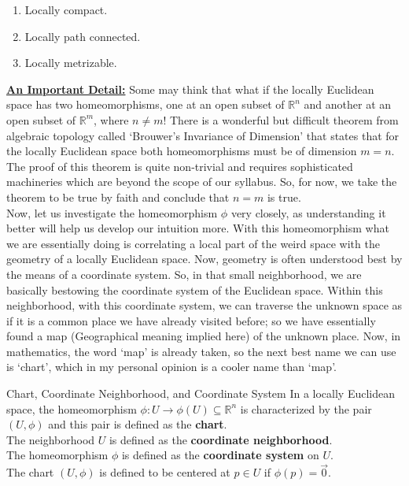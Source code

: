 \begin{enumerate}
	\item Locally compact.
	\item Locally path connected.
	\item Locally metrizable.
\end{enumerate}
\textbf{\underline{An Important Detail:}} Some may think that what if the locally Euclidean space has two homeomorphisms, one at an open subset of $\mathbb{R}^n$ and another at an open subset of $\mathbb{R}^m$, where $n\neq m$! There is a wonderful but difficult theorem from algebraic topology called `Brouwer's Invariance of Dimension' that states that for the locally Euclidean space both homeomorphisms must be of dimension $m=n$. The proof of this theorem is quite non-trivial and requires sophisticated machineries which are beyond the scope of our syllabus. So, for now, we take the theorem to be true by faith and conclude that $n=m$ is true.\\
Now, let us investigate the homeomorphism $\phi$ very closely, as understanding it better will help us develop our intuition more. With this homeomorphism what we are essentially doing is correlating a local part of the weird space with the geometry of a locally Euclidean space. Now, geometry is often understood best by the means of a coordinate system. So, in that small neighborhood, we are basically bestowing the coordinate system of the Euclidean space. Within this neighborhood, with this coordinate system, we can traverse the unknown space as if it is a common place we have already visited before; so we have essentially found a map (Geographical meaning implied here) of the unknown place. Now, in mathematics, the word `map' is already taken, so the next best name we can use is `chart', which in my personal opinion is a cooler name than `map'.
\begin{Definition}{Chart, Coordinate Neighborhood, and Coordinate System}\label{chart_coordinate_neighborhood_coordinate_system}
	In a locally Euclidean space, the homeomorphism $\phi: U\to \phi(U)\subseteq \mathbb{R}^n$ is characterized by the pair $(U,\phi)$ and this pair is defined as the \textbf{chart}.\\
	The neighborhood $U$ is defined as the \textbf{coordinate neighborhood}.\\
	The homeomorphism $\phi$ is defined as the \textbf{coordinate system} on $U$.\\
	The chart $(U,\phi)$ is defined to be centered at $p\in U$ if $\phi(p)=\vec{0}$.
\end{Definition}
